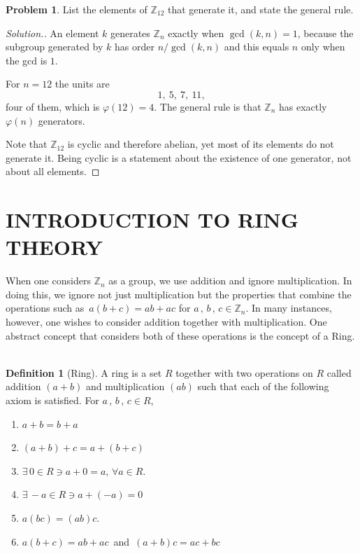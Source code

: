 \documentclass[11pt,a4paper]{article}
\theoremstyle{definition}
\newtheorem{defn}[thm]{Definition}
\newtheorem{problemx}{Problem}[subsection]
\newenvironment{problem}{\begin{problemx}}{\end{problemx}}
\newenvironment{solution}
  {\renewcommand{\qedsymbol}{}\begin{proof}[\textit{Solution}.]}
  {\end{proof}}
\begin{document}
\begin{problem}
List the elements of $\mathbb{Z}_{12}$ that generate it, and state the general
rule.
\end{problem}
\begin{solution}
An element $k$ generates $\mathbb{Z}_n$ exactly when $\gcd(k,n)=1$, because the
subgroup generated by $k$ has order $n/\gcd(k,n)$ and this equals $n$ only when
the gcd is $1$.

For $n=12$ the units are
$$1,\ 5,\ 7,\ 11 ,$$
four of them, which is $\varphi(12)=4$. The general rule is that $\mathbb{Z}_n$
has exactly $\varphi(n)$ generators.

Note that $\mathbb{Z}_{12}$ is cyclic and therefore abelian, yet most of its
elements do not generate it. Being cyclic is a statement about the existence of
one generator, not about all elements.
\end{solution}


\section{INTRODUCTION TO RING THEORY}

When one considers $\mathbb{Z}_n$ as a group, we use addition and ignore multiplication. In doing this, we ignore not just multiplication but the properties that combine the operations such as $\, a(b+c) = ab + ac$ for $a\, , \, b\, , \, c\in \mathbb{Z}_n$. In many instances, however, one wishes to consider addition together with multiplication. One abstract concept that considers both of these operations is the concept of a Ring.\\\\







\begin{defn}[Ring]
A ring is a set $R$ together with two operations on $R$ called addition $(a + b)$ and multiplication $(ab)$ such that each of the following axiom is satisfied. For $a\, , \, b\, , \, c\in R$,
\begin{enumerate}
\item $a + b = b + a$
\item $(a + b) + c = a + (b + c)$
\item $\exists\, 0\in R\ni a+ 0 = a,\, \forall a\in R$.
\item $\exists\, - a\in R\ni a + (-a) = 0$
\item $a (bc) = (ab)c$.
\item $a(b + c) = ab + ac\, $ and $\, (a + b)c = ac + bc$\\\\
\end{enumerate}
\end{defn}
\end{document}
